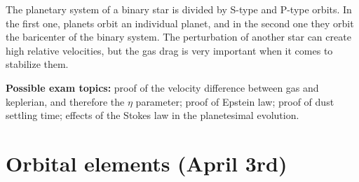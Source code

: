 \documentclass[12pt,a4paper]{article}
\begin{document}
The planetary system of a binary star is divided by S-type and P-type orbits. In the first one, planets orbit an individual planet, and in the second one they orbit the baricenter of the binary system. The perturbation of another star can create high relative velocities, but the gas drag is very important when it comes to stabilize them.

\textbf{Possible exam topics:} proof of the velocity difference between gas and keplerian, and therefore the $\eta$ parameter; proof of Epstein law; proof of dust settling time; effects of the Stokes law in the planetesimal evolution.
\vspace{10mm}

\section{Orbital elements (April 3rd)}
\end{document}
